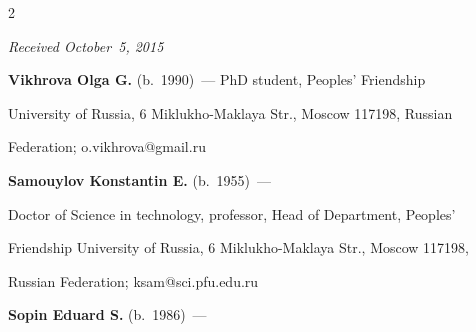 \begin{multicols}{2}
{{



 }

 }



\end{multicols}



\vspace*{-12pt}



\hfill{\small\textit{Received October~5, 2015}}



\Contr



\noindent

\textbf{Vikhrova Olga G.} (b.\ 1990)~--- PhD student, Peoples' Friendship 

University of Russia, 6 Miklukho-Maklaya Str., Moscow 117198, Russian 

Federation; o.vikhrova@gmail.ru



\vspace*{3pt}



\noindent

\textbf{Samouylov Konstantin E.} (b.\ 1955)~---

Doctor of Science in technology, professor, Head of Department, Peoples' 

Friendship University of Russia, 6 Miklukho-Maklaya Str., Moscow 117198, 

Russian Federation; ksam@sci.pfu.edu.ru



\vspace*{3pt}



\noindent

\textbf{Sopin Eduard S.} (b.\ 1986)~---

